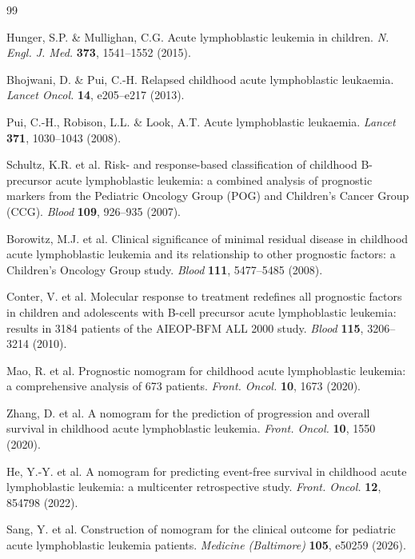 \documentclass[pdflatex,sn-nature]{sn-jnl}
\begin{document}
\begin{thebibliography}{99}

Hunger, S.P. \& Mullighan, C.G.
Acute lymphoblastic leukemia in children.
\textit{N. Engl. J. Med.} \textbf{373}, 1541--1552 (2015).

Bhojwani, D. \& Pui, C.-H.
Relapsed childhood acute lymphoblastic leukaemia.
\textit{Lancet Oncol.} \textbf{14}, e205--e217 (2013).

Pui, C.-H., Robison, L.L. \& Look, A.T.
Acute lymphoblastic leukaemia.
\textit{Lancet} \textbf{371}, 1030--1043 (2008).

Schultz, K.R. et al.
Risk- and response-based classification of childhood B-precursor acute
lymphoblastic leukemia: a combined analysis of prognostic markers from
the Pediatric Oncology Group (POG) and Children's Cancer Group (CCG).
\textit{Blood} \textbf{109}, 926--935 (2007).

Borowitz, M.J. et al.
Clinical significance of minimal residual disease in childhood acute
lymphoblastic leukemia and its relationship to other prognostic
factors: a Children's Oncology Group study.
\textit{Blood} \textbf{111}, 5477--5485 (2008).

Conter, V. et al.
Molecular response to treatment redefines all prognostic factors in
children and adolescents with B-cell precursor acute lymphoblastic
leukemia: results in 3184 patients of the AIEOP-BFM ALL 2000 study.
\textit{Blood} \textbf{115}, 3206--3214 (2010).

Mao, R. et al.
Prognostic nomogram for childhood acute lymphoblastic leukemia: a
comprehensive analysis of 673 patients.
\textit{Front. Oncol.} \textbf{10}, 1673 (2020).

Zhang, D. et al.
A nomogram for the prediction of progression and overall survival in
childhood acute lymphoblastic leukemia.
\textit{Front. Oncol.} \textbf{10}, 1550 (2020).

\bibitem{[CITE:He2022]}
He, Y.-Y. et al.
A nomogram for predicting event-free survival in childhood acute
lymphoblastic leukemia: a multicenter retrospective study.
\textit{Front. Oncol.} \textbf{12}, 854798 (2022).

Sang, Y. et al.
Construction of nomogram for the clinical outcome for pediatric acute
lymphoblastic leukemia patients.
\textit{Medicine (Baltimore)} \textbf{105}, e50259 (2026).


\end{thebibliography}
\end{document}
